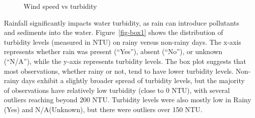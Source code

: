 \documentclass[
  letterpaper,
  DIV=11,
  numbers=noendperiod]{scrartcl}
\begin{document}
\begin{figure}


\caption{\label{fig-scatter1}Wind speed vs turbidity}

\end{figure}%

Rainfall significantly impacts water turbidity, as rain can introduce
pollutants and sediments into the water. Figure~\ref{fig-box1} shows the
distribution of turbidity levels (measured in NTU) on rainy versus
non-rainy days. The x-axis represents whether rain was present
(``Yes''), absent (``No''), or unknown (``N/A''), while the y-axis
represents turbidity levels. The box plot suggests that most
observations, whether rainy or not, tend to have lower turbidity levels.
Non-rainy days exhibit a slightly broader spread of turbidity levels,
but the majority of observations have relatively low turbidity (close to
0 NTU), with several outliers reaching beyond 200 NTU. Turbidity levels
were also mostly low in Rainy (Yes) and N/A(Unknown), but there were
outliers over 150 NTU.
\end{document}
